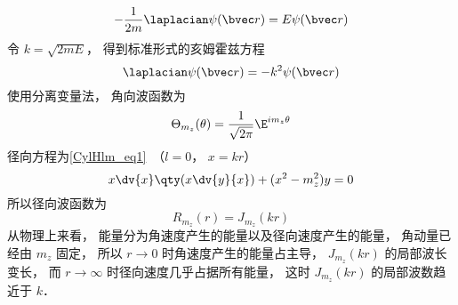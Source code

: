 
\begin{issues}
\issueDraft
\end{issues}


\begin{equation}
-\frac{1}{2m}\laplacian \psi(\bvec r) = E\psi(\bvec r)
\end{equation}
令 $k = \sqrt{2mE}$， 得到标准形式的亥姆霍兹方程
\begin{equation}
\laplacian \psi(\bvec r) = -k^2\psi(\bvec r)
\end{equation}
使用分离变量法， 角向波函数为
\begin{equation}
\Theta_{m_z}(\theta) = \frac{1}{\sqrt{2\pi}} \E^{im_z \theta}
\end{equation}
径向方程为\autoref{CylHlm_eq1}~（$l = 0$， $x = kr$）
\begin{equation}
x \dv{x} \qty(x\dv{y}{x}) + (x^2 - m_z^2)y = 0
\end{equation}
所以径向波函数为
\begin{equation}
R_{m_z}(r) = J_{m_z}(kr)
\end{equation}
从物理上来看， 能量分为角速度产生的能量以及径向速度产生的能量， 角动量已经由 $m_z$ 固定， 所以 $r \to 0$ 时角速度产生的能量占主导， $J_{m_z}(kr)$ 的局部波长变长， 而 $r\to \infty$ 时径向速度几乎占据所有能量， 这时 $J_{m_z}(kr)$ 的局部波数趋近于 $k$．
